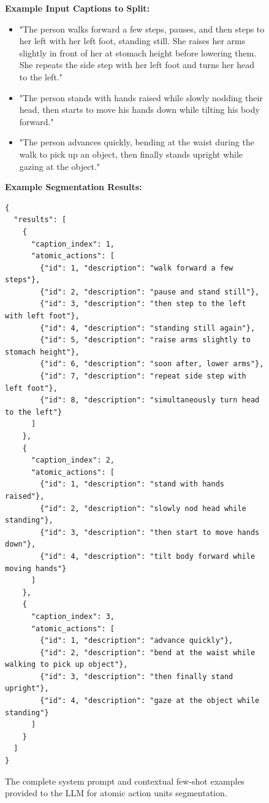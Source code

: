 \begin{figure}[h]
\begin{mdframed}[backgroundcolor=gray!10, roundcorner=5pt, innertopmargin=10pt, innerbottommargin=10pt, innerrightmargin=10pt, innerleftmargin=10pt]
{\textbf{Example Input Captions to Split:}
\begin{itemize}
    \item "The person walks forward a few steps, pauses, and then steps to her left with her left foot, standing still. She raises her arms slightly in front of her at stomach height before lowering them. She repeats the side step with her left foot and turns her head to the left."
    \item "The person stands with hands raised while slowly nodding their head, then starts to move his hands down while tilting his body forward."
    \item "The person advances quickly, bending at the waist during the walk to pick up an object, then finally stands upright while gazing at the object."
\end{itemize}

\textbf{Example Segmentation Results:}
\begin{verbatim}
{
  "results": [
    {
      "caption_index": 1,
      "atomic_actions": [
        {"id": 1, "description": "walk forward a few steps"},
        {"id": 2, "description": "pause and stand still"},
        {"id": 3, "description": "then step to the left with left foot"},
        {"id": 4, "description": "standing still again"},
        {"id": 5, "description": "raise arms slightly to stomach height"},
        {"id": 6, "description": "soon after, lower arms"},
        {"id": 7, "description": "repeat side step with left foot"},
        {"id": 8, "description": "simultaneously turn head to the left"}
      ]
    },
    {
      "caption_index": 2,
      "atomic_actions": [
        {"id": 1, "description": "stand with hands raised"},
        {"id": 2, "description": "slowly nod head while standing"},
        {"id": 3, "description": "then start to move hands down"},
        {"id": 4, "description": "tilt body forward while moving hands"}
      ]
    },
    {
      "caption_index": 3,
      "atomic_actions": [
        {"id": 1, "description": "advance quickly"},
        {"id": 2, "description": "bend at the waist while walking to pick up object"},
        {"id": 3, "description": "then finally stand upright"},
        {"id": 4, "description": "gaze at the object while standing"}
      ]
    }
  ]
}
\end{verbatim}
}
\end{mdframed}
\caption{The complete system prompt and contextual few-shot examples provided to the LLM for atomic action units segmentation.}
\label{fig:segmentation_prompt}
\end{figure}
